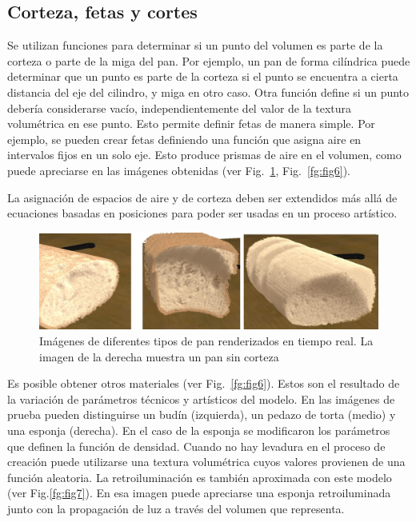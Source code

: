 \documentclass[oneside,a4paper,spanish,links]{amca}
\begin{document}
\subsection{Corteza, fetas y cortes}

Se utilizan funciones para determinar si un punto del volumen es parte
de la corteza o parte de la miga del pan. Por ejemplo, un pan de forma
cilíndrica puede determinar que un punto es parte de la corteza si el
punto se encuentra a cierta distancia del eje del cilindro, y miga en
otro caso. Otra función define si un punto debería considerarse vacío,
independientemente del valor de la textura volumétrica en ese punto. Esto
permite definir fetas de manera simple. Por ejemplo, se pueden crear
fetas definiendo una función que asigna aire en intervalos fijos en un
solo eje. Esto produce prismas de aire en el volumen, como puede
apreciarse en las imágenes obtenidas (ver Fig.~\ref{fg:fig5},
Fig.~\ref{fg:fig6}). 

La asignación de espacios de aire y de corteza deben ser extendidos más
allá de ecuaciones basadas en posiciones para poder ser usadas en un
proceso artístico.

\begin{figure}[htb!]
  \centerline{\includegraphics[scale=0.3]{fig5}}
  \caption{Imágenes de diferentes tipos de pan renderizados en tiempo
    real. La imagen de la derecha muestra un pan sin corteza}
  \label{fg:fig5}
\end{figure}

Es posible obtener otros materiales (ver Fig.~\ref{fg:fig6}). Estos son
el resultado de la variación de parámetros técnicos y artísticos del
modelo. En las imágenes de prueba pueden distinguirse un budín (izquierda), un
pedazo de torta (medio) y una esponja (derecha). En el caso de la esponja
se modificaron los parámetros que definen la función de
densidad. Cuando no hay levadura en el proceso de creación puede
utilizarse una textura volumétrica cuyos valores provienen de una
función aleatoria. La retroiluminación es también aproximada con
este modelo (ver Fig.\ref{fg:fig7}). En esa imagen puede apreciarse
una esponja retroiluminada junto con la propagación de luz a
través del volumen que representa.
\end{document}
